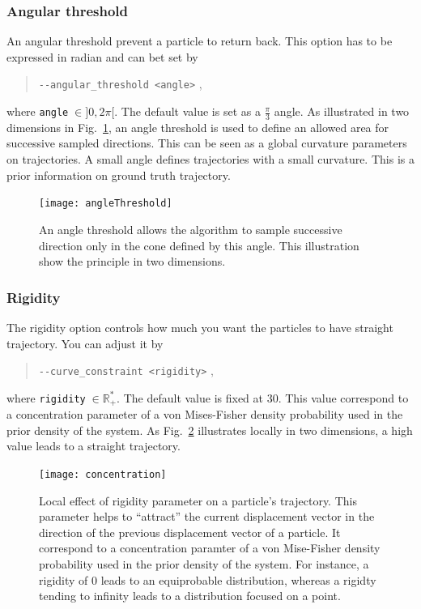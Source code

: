     \subsubsection*{Angular threshold}
        An angular threshold prevent a particle to return back. This option has 
        to be expressed in radian and can bet set by
            \begin{quote}
                \texttt{-\hspace{0.1mm}-angular\_threshold <angle>} \enspace ,
            \end{quote}
        where \texttt{angle}$\;\in]0,2\pi[$. The default value is set as a 
        $\tfrac{\pi}{3}$ angle. As illustrated in two dimensions in
Fig.~\ref{tracto-fig:angleThreshold}, an angle threshold is used to define an
allowed area for successive sampled directions. This can be seen as a global
curvature parameters on trajectories. A small angle defines trajectories with a
small curvature. This is a prior information on ground truth trajectory.

        \begin{figure}
            \centering
            \texttt{[image: angleThreshold]}
            \caption{An angle threshold allows the algorithm to sample
successive direction only in the cone defined by this angle. This
illustration show the principle in two dimensions.}
            \label{tracto-fig:angleThreshold}
        \end{figure}


    \subsubsection*{Rigidity}
        The rigidity option controls how much you want the particles to have 
        straight trajectory. You can adjust it by
            \begin{quote}
                \texttt{-\hspace{0.1mm}-curve\_constraint <rigidity>} \enspace ,
            \end{quote}
        where \texttt{rigidity}$\;\in\mathbb{R}_+^*$. The default value is
fixed at 30. This value correspond to a concentration parameter of a von
Mises-Fisher density probability used in the prior density of the system. As
Fig.~\ref{tracto-fig:concentration} illustrates locally in two dimensions, a
high value leads to a straight trajectory.

        \begin{figure}
            \centering
            \texttt{[image: concentration]}
            \caption{Local effect of rigidity parameter on a particle's
trajectory. This parameter helps to ``attract'' the current
displacement vector in the direction of the previous displacement vector of a
particle. It correspond to a concentration paramter of a von Mise-Fisher density
probability used in the prior density of the system. For instance, a rigidity of
0 leads to an equiprobable distribution, whereas a rigidty tending to infinity
leads to a distribution focused on a point.}
            \label{tracto-fig:concentration}
        \end{figure}


